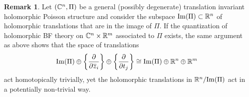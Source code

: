 \documentclass[11pt, oneside, reqno]{amsart}
\theoremstyle{definition} \newtheorem{definition}{Definition}[section]
\theoremstyle{definition}
\theoremstyle{remark}
\theoremstyle{definition} \newtheorem{remark}[definition]{Remark}
\theoremstyle{definition} \newtheorem{remarks}[definition]{Remarks}
\theoremstyle{definition} \newtheorem{question}[definition]{Question}
\theoremstyle{definition} \newtheorem*{note}{Note}
\theoremstyle{definition} \newtheorem{example}[definition]{Example}
\theoremstyle{definition} \newtheorem{examples}[definition]{Examples}
\def\Bar{\overline}
\begin{document}
\begin{remark}
Let $(\mathbb C^n , \Pi)$ be a general (possibly degenerate) translation invariant holomorphic Poisson structure and consider the subspace ${\rm Im} (\Pi) \subset \mathbb R^n$ of holomorphic translations that are in the image of $\Pi$.  
If the quantization of holomorphic BF theory on $\mathbb C^n \times \mathbb R^m$ associated to $\Pi$ exists, the same argument as above shows that the space of translations
\[
{\rm Im}(\Pi) \oplus \left\{\frac{\partial}{\partial \Bar{z}_i}\right\} \oplus \left\{\frac{\partial}{\partial t_j}\right\} \cong {\rm Im}(\Pi) \oplus \RR^n \oplus \RR^m
\]
act homotopically trivially, yet the holomorphic translations in $\mathbb R^n / {\rm Im}(\Pi)$ act in a potentially non-trivial way. 
\end{remark}

\printbibliography
% 
% 
\end{document}
